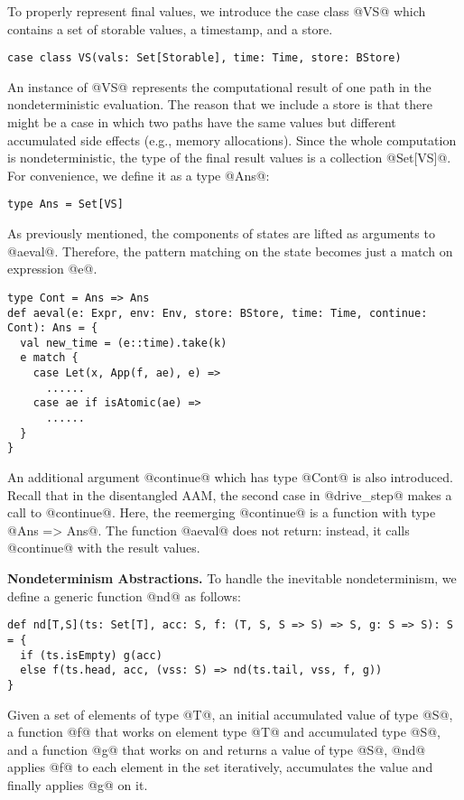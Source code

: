 \documentclass[acmsmall]{acmart}\settopmatter{}
\begin{document}
To properly represent final values, we introduce the case class @VS@ which
contains a set of storable values, a timestamp, and a store.
\begin{lstlisting}
case class VS(vals: Set[Storable], time: Time, store: BStore)
\end{lstlisting}
An instance of @VS@ represents the computational result of one path in
the nondeterministic evaluation.
The reason that we include a store is that there might be a case in which two paths
have the same values but different accumulated side effects (e.g., memory allocations).
Since the whole computation is nondeterministic, the type of the final result
values is a collection @Set[VS]@. For convenience, we define it as a type @Ans@:
\begin{lstlisting}
type Ans = Set[VS]
\end{lstlisting}

As previously mentioned, the components of states are lifted as arguments to
@aeval@. Therefore, the pattern matching on the state becomes just a match on
expression @e@.
\begin{lstlisting}
type Cont = Ans => Ans
def aeval(e: Expr, env: Env, store: BStore, time: Time, continue: Cont): Ans = {
  val new_time = (e::time).take(k)
  e match {
    case Let(x, App(f, ae), e) =>
      ......
    case ae if isAtomic(ae) =>
      ......
  }
}
\end{lstlisting}

An additional argument @continue@ which has type @Cont@ is also introduced.
Recall that in the disentangled AAM, the second case in @drive_step@
makes a call to @continue@. Here, the reemerging @continue@ is a function
with type @Ans => Ans@. The function @aeval@ does not return: instead, it calls
@continue@ with the result values.

\textbf{Nondeterminism Abstractions.}
To handle the inevitable nondeterminism, we define a generic function @nd@ as follows:
\begin{lstlisting}
def nd[T,S](ts: Set[T], acc: S, f: (T, S, S => S) => S, g: S => S): S = {
  if (ts.isEmpty) g(acc)
  else f(ts.head, acc, (vss: S) => nd(ts.tail, vss, f, g))
}
\end{lstlisting}

Given a set of elements of type @T@, an initial accumulated value of type @S@, a function @f@
that works on element type @T@ and accumulated type @S@, and a function @g@ that
works on and returns a value of type @S@, @nd@ applies @f@ to each element in the
set iteratively, accumulates the value and finally applies @g@ on it.
\end{document}
